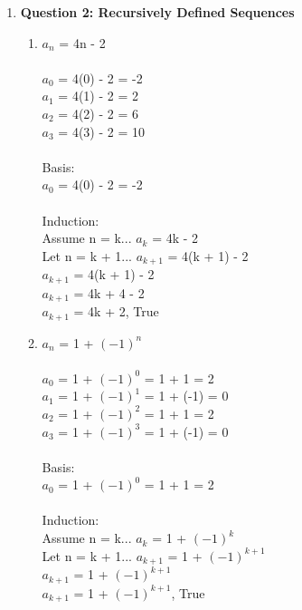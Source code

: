 \documentclass[11pt]{article}
\begin{document}
\begin{enumerate}
\item
\textbf{Question 2: Recursively Defined Sequences } %
\begin{enumerate}[label=(\alph*)]
\item %
$a_n$ = 4n - 2 \\
\\
$a_0$ = 4(0) - 2 = -2 \\
$a_1$ = 4(1) - 2 = 2 \\
$a_2$ = 4(2) - 2 = 6 \\
$a_3$ = 4(3) - 2 = 10 \\
\\
Basis: \\
$a_0$ = 4(0) - 2 = -2 \\
\\
Induction: \\
Assume n = k... $a_k$ = 4k - 2 \\
Let n = k + 1... $a_{k+1}$ = 4(k + 1) - 2 \\
$a_{k+1}$ = 4(k + 1) - 2 \\
$a_{k+1}$ = 4k + 4 - 2 \\
$a_{k+1}$ = 4k + 2, True \\

\item %
$a_n$ = 1 + $(-1)^n$ \\
\\
$a_0$ = 1 + $(-1)^0$ = 1 + 1 = 2 \\
$a_1$ = 1 + $(-1)^1$ = 1 + (-1) = 0 \\
$a_2$ = 1 + $(-1)^2$ = 1 + 1 = 2 \\
$a_3$ = 1 + $(-1)^3$ = 1 + (-1) = 0 \\
\\
Basis: \\
$a_0$ = 1 + $(-1)^0$ = 1 + 1 = 2 \\
\\
Induction: \\
Assume n = k... $a_k$ = 1 + $(-1)^k$ \\
Let n = k + 1... $a_{k + 1}$ = 1 + $(-1)^{k + 1}$ \\
$a_{k + 1}$ = 1 + $(-1)^{k + 1}$ \\
$a_{k + 1}$ = 1 + $(-1)^{k + 1}$, True \\


\end{enumerate}
\end{enumerate}
\end{document}
